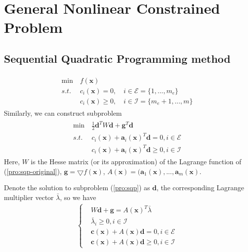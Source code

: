 \par
\section{General Nonlinear Constrained Problem}
\par
\subsection{Sequential Quadratic Programming method}
\par
\begin{align}
    \begin{array}{lll}
        \min \ &f(\mathbf{x}) \\
        s.t. \ &c_i(\mathbf{x}) = 0, \quad i \in \mathcal{E} = \{1,...,m_e\} \\
        &c_i(\mathbf{x}) \geq 0, \quad i \in \mathcal{I} = \{m_e+1,...,m\}
    \end{array}
    \label{pro:sqp-original}
\end{align}
Similarly, we can construct subproblem
\begin{align}
    \begin{array}{lll}
        \min \ &\frac{1}{2}\mathbf{d}^TW\mathbf{d} + \mathbf{g}^T\mathbf{d} \\
        s.t. \ &c_i(\mathbf{x}) + \mathbf{a}_i(\mathbf{x})^T\mathbf{d} = 0, i \in \mathcal{E} \\
         &c_i(\mathbf{x}) + \mathbf{a}_i(\mathbf{x})^T\mathbf{d} \geq 0, i \in \mathcal{I}
    \end{array}
    \label{pro:sqp}
\end{align}
Here, $W$ is the Hesse matrix (or its approximation) of the Lagrange
function of (\ref{pro:sqp-original}), $\mathbf{g} = \bigtriangledown f(\mathbf{x})$,
$A(\mathbf{x}) = (\mathbf{a}_1(\mathbf{x}),...,\mathbf{a}_m(\mathbf{x})$.

Denote the solution to subproblem (\ref{pro:sqp}) as $\mathbf{d}$,
the corresponding Lagrange multiplier vector $\bar{\lambda}$,
so we have
\begin{align}
    \left\{
        \begin{array}{llll}
            &W\mathbf{d} + \mathbf{g} = A(\mathbf{x})^T\bar{\lambda} \\
            &\bar{\lambda}_i \geq 0, i \in \mathcal{I} \\
            &\mathbf{c}(\mathbf{x}) + A(\mathbf{x})\mathbf{d} = 0, i \in \mathcal{E} \\
            &\mathbf{c}(\mathbf{x}) + A(\mathbf{x})\mathbf{d} \geq 0, i \in \mathcal{I}
        \end{array}\right.
\end{align}

